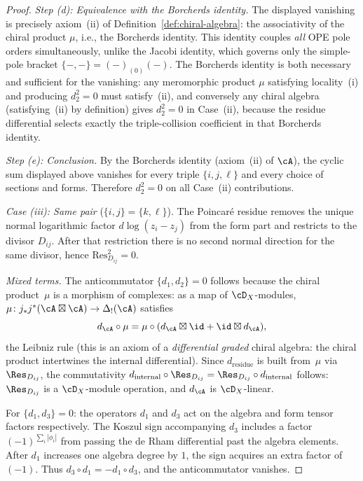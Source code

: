 \begin{proof}
\smallskip
\emph{Step (d): Equivalence with the Borcherds identity.}
The displayed vanishing is precisely
axiom~(ii) of Definition~\ref{def:chiral-algebra}: the
associativity of the chiral product $\mu$, i.e., the
Borcherds identity. This identity couples
\emph{all} OPE pole orders simultaneously, unlike the
Jacobi identity, which governs only the simple-pole bracket
$\{-,-\} = (-)_{(0)}(-)$.
The Borcherds identity is both necessary and sufficient for the
vanishing: any meromorphic product $\mu$ satisfying
locality~(i) and producing $d_2^2=0$ must satisfy~(ii), and
conversely any chiral algebra (satisfying~(ii) by definition)
gives $d_2^2=0$ in Case~(ii), because the residue differential
selects exactly the triple-collision coefficient in that Borcherds
identity.

\smallskip
\emph{Step (e): Conclusion.}
By the Borcherds identity (axiom~(ii) of $\cA$), the cyclic
sum displayed above vanishes for every triple
$\{i,j,\ell\}$ and every choice of sections and forms.
Therefore $d_2^2 = 0$ on all Case~(ii) contributions.

\emph{Case (iii): Same pair} ($\{i,j\} = \{k,\ell\}$). The
Poincar\'e residue removes the unique normal logarithmic factor
$d\log(z_i-z_j)$ from the form part and restricts to the divisor
$D_{ij}$. After that restriction there is no second normal direction
for the same divisor, hence
$\text{Res}_{D_{ij}}^2 = 0$.

\emph{Mixed terms.} The anticommutator $\{d_1, d_2\} = 0$
follows because the chiral product~$\mu$ is a morphism
of complexes: as a map of $\cD_X$-modules,
$\mu \colon j_* j^*(\cA \boxtimes \cA) \to \Delta_!(\cA)$
satisfies
\[
d_\cA \circ \mu = \mu \circ (d_\cA \boxtimes \id
 + \id \boxtimes d_\cA),
\]
the Leibniz rule (this is an axiom of a \emph{differential
graded} chiral algebra: the chiral product intertwines the
internal differential). Since $d_{\mathrm{residue}}$ is
built from~$\mu$ via $\Res_{D_{ij}}$, the commutativity
$d_{\mathrm{internal}} \circ \Res_{D_{ij}}
= \Res_{D_{ij}} \circ d_{\mathrm{internal}}$ follows:
$\Res_{D_{ij}}$ is a $\cD_X$-module operation, and
$d_\cA$ is $\cD_X$-linear.

For $\{d_1, d_3\} = 0$: the operators $d_1$ and $d_3$ act on the algebra and form tensor factors respectively. The Koszul sign accompanying $d_3$ includes a factor $(-1)^{\sum_i |\phi_i|}$ from passing the de Rham differential past the algebra elements. After $d_1$ increases one algebra degree by $1$, the sign acquires an extra factor of $(-1)$. Thus $d_3 \circ d_1 = -d_1 \circ d_3$, and the anticommutator vanishes.


\end{proof}
